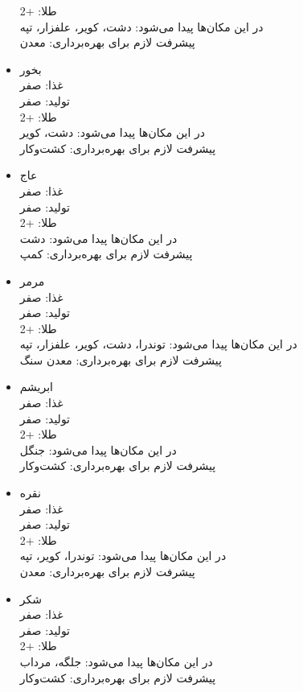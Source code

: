 \documentclass[]{article}
\begin{document}
\begin{itemize}
طلا: +2\\
در این مکان‌ها پیدا می‌شود: دشت، کویر، علفزار، تپه\\
پیشرفت لازم برای بهره‌برداری: معدن
\item بخور\\
غذا: صفر\\
تولید‌: صفر\\
طلا: +2\\
در این مکان‌ها پیدا می‌شود: دشت، کویر\\
پیشرفت لازم برای بهره‌برداری: کشت‌وکار
\item عاج\\
غذا: صفر\\
تولید‌: صفر\\
طلا: +2\\
در این مکان‌ها پیدا می‌شود: دشت\\
پیشرفت لازم برای بهره‌برداری: کمپ
\item مرمر\\
غذا: صفر\\
تولید‌: صفر\\
طلا: +2\\
در این مکان‌ها پیدا می‌شود: توندرا، دشت، کویر، علفزار، تپه\\
پیشرفت لازم برای بهره‌برداری: معدن سنگ
\item ابریشم\\
غذا: صفر\\
تولید‌: صفر\\
طلا: +2\\
در این مکان‌ها پیدا می‌شود: جنگل\\
پیشرفت لازم برای بهره‌برداری: کشت‌وکار
\item نقره\\
غذا: صفر\\
تولید‌: صفر\\
طلا: +2\\
در این مکان‌ها پیدا می‌شود: توندرا، کویر، تپه\\
پیشرفت لازم برای بهره‌برداری: معدن
\item شکر\\
غذا: صفر\\
تولید‌: صفر\\
طلا: +2\\
در این مکان‌ها پیدا می‌شود: جلگه، مرداب\\
پیشرفت لازم برای بهره‌برداری: کشت‌وکار
\end{itemize}
\end{document}
